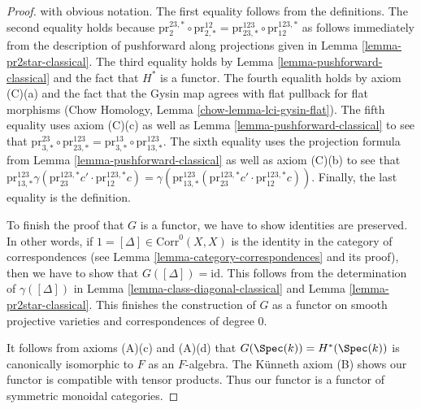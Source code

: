 \begin{proof}
with obvious notation. The first equality follows from the definitions.
The second equality holds because
$\text{pr}^{23, *}_2 \circ \text{pr}^{12}_{2, *} =
\text{pr}^{123}_{23, *} \circ \text{pr}^{123, *}_{12}$
as follows immediately from the description of pushforward
along projections given in Lemma \ref{lemma-pr2star-classical}.
The third equality holds by Lemma \ref{lemma-pushforward-classical}
and the fact that $H^*$ is a functor.
The fourth equalith holds by axiom (C)(a) and the fact that
the Gysin map agrees with flat pullback for flat morphisms
(Chow Homology, Lemma \ref{chow-lemma-lci-gysin-flat}).
The fifth equality uses axiom (C)(c) as well as
Lemma \ref{lemma-pushforward-classical} to see that
$\text{pr}^{23}_{3, *} \circ \text{pr}^{123}_{23, *} =
\text{pr}^{13}_{3, *} \circ \text{pr}^{123}_{13, *}$.
The sixth equality uses the projection formula from
Lemma \ref{lemma-pushforward-classical} as well as
axiom (C)(b) to see that $
\text{pr}^{123}_{13, *}
\gamma(\text{pr}^{123, *}_{23}c' \cdot \text{pr}^{123, *}_{12}c) =
\gamma(\text{pr}^{123}_{13, *}(
\text{pr}^{123, *}_{23}c' \cdot \text{pr}^{123, *}_{12}c))$.
Finally, the last equality is the definition.

\medskip\noindent
To finish the proof that $G$ is a functor,
we have to show identities are preserved. In other words, if
$1 = [\Delta] \in \text{Corr}^0(X, X)$ is the identity
in the category of correspondences (see
Lemma \ref{lemma-category-correspondences} and its proof),
then we have to show that $G([\Delta]) = \text{id}$.
This follows from the determination of
$\gamma([\Delta])$ in Lemma \ref{lemma-class-diagonal-classical}
and Lemma \ref{lemma-pr2star-classical}.
This finishes the construction of $G$ as a functor on
smooth projective varieties and correspondences of degree $0$.

\medskip\noindent
It follows from axioms (A)(c) and (A)(d) that
$G(\Spec(k)) = H^*(\Spec(k))$ is canonically isomorphic to $F$
as an $F$-algebra.
The K\"unneth axiom (B) shows our functor is compatible with tensor products.
Thus our functor is a functor of symmetric monoidal categories.


\end{proof}
